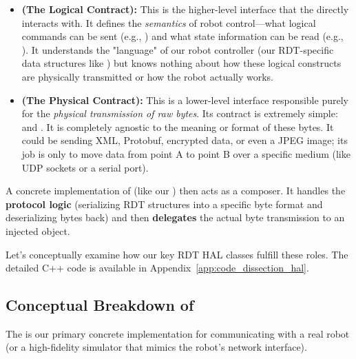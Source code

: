 \begin{itemize}
    \item \textbf{ (The Logical Contract):} This is the higher-level interface that the  directly interacts with. It defines the \textit{semantics} of robot control—what logical commands can be sent (e.g., ) and what state information can be read (e.g., ). It understands the "language" of our robot controller (our RDT-specific data structures like ) but knows nothing about how these logical constructs are physically transmitted or how the robot actually works.
    
    \item \textbf{ (The Physical Contract):} This is a lower-level interface responsible purely for the \textit{physical transmission of raw bytes}. Its contract is extremely simple:  and . It is completely agnostic to the meaning or format of these bytes. It could be sending XML, Protobuf, encrypted data, or even a JPEG image; its job is only to move data from point A to point B over a specific medium (like UDP sockets or a serial port).
\end{itemize}

A concrete implementation of  (like our ) then acts as a composer. It handles the \textbf{protocol logic} (serializing RDT structures into a specific byte format and deserializing bytes back) and then \textbf{delegates} the actual byte transmission to an injected  object.

Let's conceptually examine how our key RDT HAL classes fulfill these roles. The detailed C++ code is available in Appendix~\ref{app:code_dissection_hal}.

\subsection{Conceptual Breakdown of }
\label{subsec:conceptual_udp_motion_interface}

The  is our primary concrete implementation for communicating with a real robot (or a high-fidelity simulator that mimics the robot's network interface).


